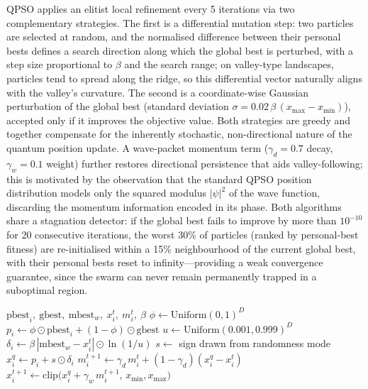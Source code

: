 \documentclass[11pt]{article}
\begin{document}
QPSO applies an elitist local refinement every 5 iterations via two complementary strategies. The first is a differential mutation step: two particles are selected at random, and the normalised difference between their personal bests defines a search direction along which the global best is perturbed, with a step size proportional to $\beta$ and the search range; on valley-type landscapes, particles tend to spread along the ridge, so this differential vector naturally aligns with the valley's curvature. The second is a coordinate-wise Gaussian perturbation of the global best (standard deviation $\sigma = 0.02\,\beta\,(x_{\max}-x_{\min})$), accepted only if it improves the objective value. Both strategies are greedy and together compensate for the inherently stochastic, non-directional nature of the quantum position update. A wave-packet momentum term ($\gamma_d = 0.7$ decay, $\gamma_w=0.1$ weight) further restores directional persistence that aids valley-following; this is motivated by the observation that the standard QPSO position distribution models only the squared modulus $|\psi|^2$ of the wave function, discarding the momentum information encoded in its phase. Both algorithms share a stagnation detector: if the global best fails to improve by more than $10^{-10}$ for 20 consecutive iterations, the worst 30\% of particles (ranked by personal-best fitness) are re-initialised within a 15\% neighbourhood of the current global best, with their personal bests reset to infinity---providing a weak convergence guarantee, since the swarm can never remain permanently trapped in a suboptimal region.

\begin{algorithm}[h]
\caption{QPSO position update for particle $i$ at iteration $t$.}
\begin{algorithmic}[1]
\Require $\mathrm{pbest}_i,\ \mathrm{gbest},\ \mathrm{mbest}_w,\ x_i^t,\ m_i^t,\ \beta$
\State $\phi \gets \mathrm{Uniform}(0,1)^D$
\State $p_i \gets \phi \odot \mathrm{pbest}_i + (1-\phi)\odot \mathrm{gbest}$ 
\State $u \gets \mathrm{Uniform}(0.001,0.999)^D$
\State $\delta_i \gets \beta\,|\mathrm{mbest}_w - x_i^t| \odot \ln(1/u)$ 
\State $s \gets$ sign drawn from randomness mode 
\State $x_i^q \gets p_i + s \odot \delta_i$ 
\State $m_i^{t+1} \gets \gamma_d\, m_i^t + (1-\gamma_d)(x_i^q - x_i^t)$ 
\State $x_i^{t+1} \gets \mathrm{clip}\big(x_i^q + \gamma_w\, m_i^{t+1},\, x_{\min}, x_{\max}\big)$ 
\end{algorithmic}
\end{algorithm}
\end{document}

